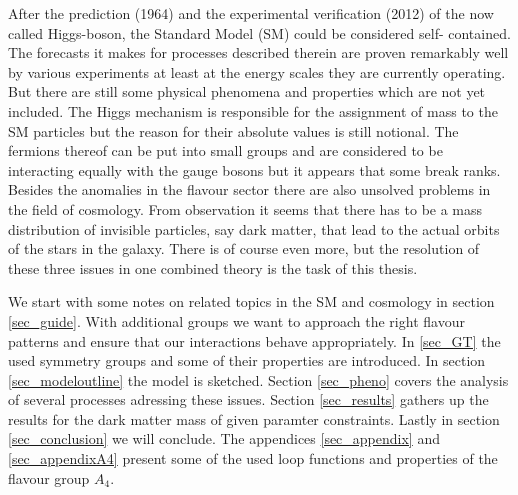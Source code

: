 After the prediction (1964) and the experimental verification (2012) of the
now called Higgs-boson, the Standard Model (SM) could be considered self-
contained. The forecasts it makes for processes described therein are proven
remarkably well by various experiments at least at the energy scales they
are currently operating. But there are still some physical phenomena and
properties which are not yet included. The Higgs mechanism is responsible
for the assignment of mass to the SM particles but the reason for their
absolute values is still notional. The fermions thereof can be put into
small groups and are considered to be interacting equally with the gauge bosons but it appears
that some break ranks. Besides the anomalies in the flavour sector there are also unsolved problems
in the field of cosmology. From observation it seems that there has to be a mass distribution of
invisible particles, say dark matter, that lead to the actual orbits of the stars in the galaxy.
There is of course even more, but the resolution of these three issues in one combined theory is
the task of this thesis.

\noindent We start with some notes on 
related topics in the SM and cosmology in section \ref{sec_guide}. With additional groups we want
to approach the right flavour patterns and ensure that our interactions behave appropriately. In \ref{sec_GT} the used symmetry groups and some of 
their properties are introduced. In section \ref{sec_modeloutline} the model
is sketched. Section \ref{sec_pheno} covers the analysis of several processes adressing these issues. 
Section \ref{sec_results} gathers up the results for the dark matter mass of given paramter constraints.
Lastly in section \ref{sec_conclusion} we will conclude. The appendices \ref{sec_appendix} and \ref{sec_appendixA4} present some of
the used loop functions and properties of the flavour group $A_4$.
